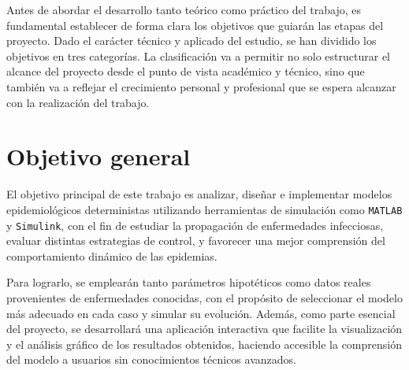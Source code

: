 
Antes de abordar el desarrollo tanto teórico como práctico del trabajo, es fundamental establecer de forma clara los objetivos que guiarán las etapas del proyecto. Dado el carácter técnico y aplicado del estudio, se han dividido los objetivos en tres categorías. La clasificación va a permitir no solo estructurar el alcance del proyecto desde el punto de vista académico y técnico, sino que también va a reflejar el crecimiento personal y profesional que se espera alcanzar con la realización del trabajo.

\section{Objetivo general}
El objetivo principal de este trabajo es analizar, diseñar e implementar modelos epidemiológicos deterministas utilizando herramientas de simulación como \texttt{MATLAB} y \texttt{Simulink}, con el fin de estudiar la propagación de enfermedades infecciosas, evaluar distintas estrategias de control, y favorecer una mejor comprensión del comportamiento dinámico de las epidemias.

Para lograrlo, se emplearán tanto parámetros hipotéticos como datos reales provenientes de enfermedades conocidas, con el propósito de seleccionar el modelo más adecuado en cada caso y simular su evolución. Además, como parte esencial del proyecto, se desarrollará una aplicación interactiva que facilite la visualización y el análisis gráfico de los resultados obtenidos, haciendo accesible la comprensión del modelo a usuarios sin conocimientos técnicos avanzados.

